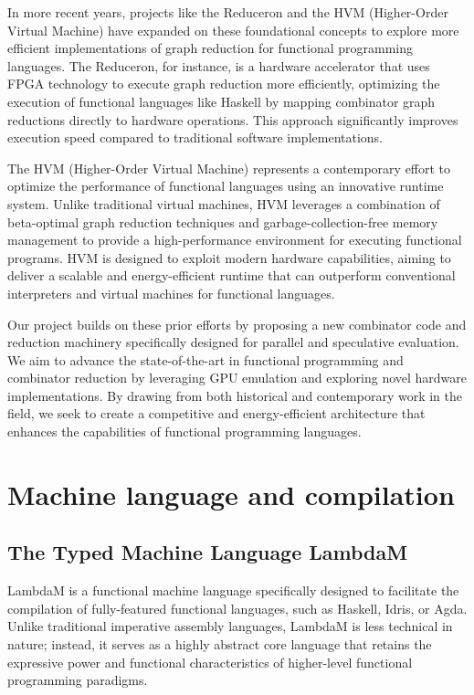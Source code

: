 \documentclass{IEEEtran}
\begin{document}
\par In more recent years, projects like the Reduceron \cite{Reduceron2008} \cite{Reduceron2010} and the HVM (Higher-Order Virtual Machine) have expanded on these foundational concepts to explore more efficient implementations of graph reduction for functional programming languages. The Reduceron, for instance, is a hardware accelerator that uses FPGA technology to execute graph reduction more efficiently, optimizing the execution of functional languages like Haskell by mapping combinator graph reductions directly to hardware operations. This approach significantly improves execution speed compared to traditional software implementations.

\par The HVM (Higher-Order Virtual Machine) represents a contemporary effort to optimize the performance of functional languages using an innovative runtime system. Unlike traditional virtual machines, HVM leverages a combination of beta-optimal graph reduction techniques and garbage-collection-free memory management to provide a high-performance environment for executing functional programs. HVM is designed to exploit modern hardware capabilities, aiming to deliver a scalable and energy-efficient runtime that can outperform conventional interpreters and virtual machines for functional languages.

\par Our project builds on these prior efforts by proposing a new combinator code and reduction machinery specifically designed for parallel and speculative evaluation. We aim to advance the state-of-the-art in functional programming and combinator reduction by leveraging GPU emulation and exploring novel hardware implementations. By drawing from both historical and contemporary work in the field, we seek to create a competitive and energy-efficient architecture that enhances the capabilities of functional programming languages.

\section{Machine language and compilation}

\subsection{The Typed Machine Language LambdaM}

\par LambdaM is a functional machine language specifically designed to facilitate the compilation of fully-featured functional languages, such as Haskell, Idris, or Agda. Unlike traditional imperative assembly languages, LambdaM is less technical in nature; instead, it serves as a highly abstract core language that retains the expressive power and functional characteristics of higher-level functional programming paradigms.
\end{document}
